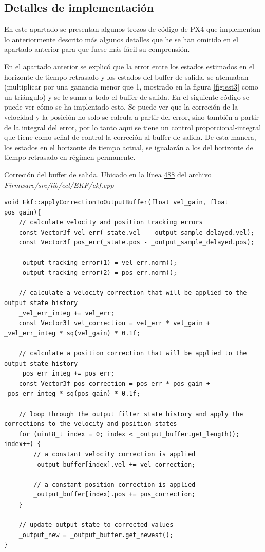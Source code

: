 



\subsection{Detalles de implementación}
En este apartado se presentan algunos trozos de código de PX4 que implementan lo anteriormente descrito más algunos detalles que he se han omitido en el apartado anterior para que fuese más fácil su comprensión.

En el apartado anterior se explicó que la error entre los estados estimados en el horizonte de tiempo retrasado y los estados del buffer de salida, se atenuaban (multiplicar por una ganancia menor que 1, mostrado en la figura \ref{fig:est3} como un triángulo) y se le suma a todo el buffer de salida. En el siguiente código se puede ver cómo se ha implentado esto. Se puede ver que la correción de la velocidad y la posición no solo se calcula a partir del error, sino también a partir de la integral del error, por lo tanto aqui se tiene un control proporcional-integral que tiene como señal de control la correción al buffer de salida. De esta manera, los estados en el horizonte de tiempo actual, se igualarán a los del horizonte de tiempo retrasado en régimen permanente. 

\begin{codigo}{Correción del buffer de salida. Ubicado en  la línea \href{https://github.com/PX4/PX4-ECL/blob/ec934908900b23ee273d1a9f82364b7b38423200/EKF/ekf.cpp\#L488}{488} del archivo \textit{Firmware/src/lib/ecl/EKF/ekf.cpp}}
\begin{verbatim}
void Ekf::applyCorrectionToOutputBuffer(float vel_gain, float pos_gain){
	// calculate velocity and position tracking errors
	const Vector3f vel_err(_state.vel - _output_sample_delayed.vel);
	const Vector3f pos_err(_state.pos - _output_sample_delayed.pos);

	_output_tracking_error(1) = vel_err.norm();
	_output_tracking_error(2) = pos_err.norm();

	// calculate a velocity correction that will be applied to the output state history
	_vel_err_integ += vel_err;
	const Vector3f vel_correction = vel_err * vel_gain + _vel_err_integ * sq(vel_gain) * 0.1f;

	// calculate a position correction that will be applied to the output state history
	_pos_err_integ += pos_err;
	const Vector3f pos_correction = pos_err * pos_gain + _pos_err_integ * sq(pos_gain) * 0.1f;

	// loop through the output filter state history and apply the corrections to the velocity and position states
	for (uint8_t index = 0; index < _output_buffer.get_length(); index++) {
		// a constant velocity correction is applied
		_output_buffer[index].vel += vel_correction;

		// a constant position correction is applied
		_output_buffer[index].pos += pos_correction;
	}

	// update output state to corrected values
	_output_new = _output_buffer.get_newest();
}
\end{verbatim}
\end{codigo} 

